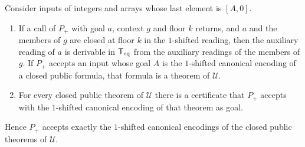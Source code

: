 \begin{proposition}\label{cert:prop:offset}
Consider inputs of integers and arrays whose last element is $[A,0]$.
\begin{enumerate}[label=(\alph*)]
\item If a call of $P_{+}$ with goal $a$, context $g$ and floor $k$ returns, and
$a$ and the members of $g$ are closed at floor $k$ in the $1$-shifted reading,
then the auxiliary reading of $a$ is derivable in $\mathsf{T}_{\mathrm{eq}}$ from the auxiliary
readings of the members of $g$. If $P_{+}$ accepts an input whose goal $A$ is the
$1$-shifted canonical encoding of a closed public formula, that formula is a
theorem of $\mathcal U$.
\item For every closed public theorem of $\mathcal U$ there is a certificate that
$P_{+}$ accepts with the $1$-shifted canonical encoding of that theorem as goal.
\end{enumerate}
Hence $P_{+}$ accepts exactly the $1$-shifted canonical encodings of the closed
public theorems of $\mathcal U$.
\end{proposition}
